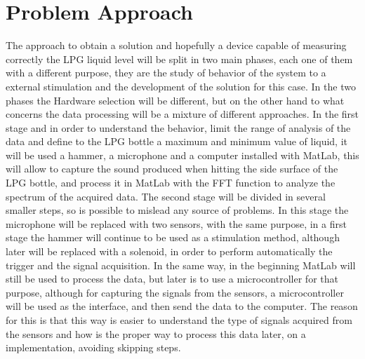 \section{Problem Approach}
The approach to obtain a solution and hopefully a device capable of measuring correctly the LPG liquid level will be split in two main phases, each one of them with a different purpose, they are the study of behavior of the system to a external stimulation and the development of the solution for this case. In the two phases the Hardware selection will be different, but on the other hand to what concerns the data processing will be a mixture of different approaches.
In the first stage and in order to understand the behavior, limit the range of analysis of the data and define to the LPG bottle a maximum and minimum value of liquid, it will be used a hammer, a microphone and a computer installed with MatLab, this will allow to capture the sound produced when hitting the side surface of the LPG bottle, and process it in MatLab with the FFT function to analyze the spectrum of the acquired data.
The second stage will be divided in several smaller steps, so is possible to mislead any source of problems. In this stage the microphone will be replaced with two sensors, with the same purpose, in a first stage the hammer will continue to be used as a stimulation method, although later will be replaced with a solenoid, in order to perform automatically the trigger and the signal acquisition. In the same way, in the beginning MatLab will still be used to process the data, but later is to use a microcontroller for that purpose, although for capturing the signals from the sensors, a microcontroller will be used as the interface, and then send the data to the computer. The reason for this is that this way is easier to understand the type of signals acquired from the sensors and how is the proper way to process this data later, on a implementation, avoiding skipping steps.

\clearpage
